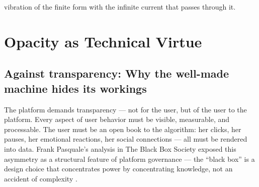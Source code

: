 vibration of the finite form with the infinite current that passes through it.

\section{Opacity as Technical Virtue}

\subsection{Against transparency: Why the well-made machine hides its workings}

The platform demands transparency — not for the user, but of the user to the platform. Every aspect of user behavior must be visible, measurable, and processable. The user must be an open book to the algorithm: her clicks, her pauses, her emotional reactions, her social connections — all must be rendered into data. Frank Pasquale’s analysis in The Black Box Society exposed this asymmetry as a structural feature of platform governance — the “black box” is a design choice that concentrates power by concentrating knowledge, not an accident of complexity \cite{pasquale_2015}.

